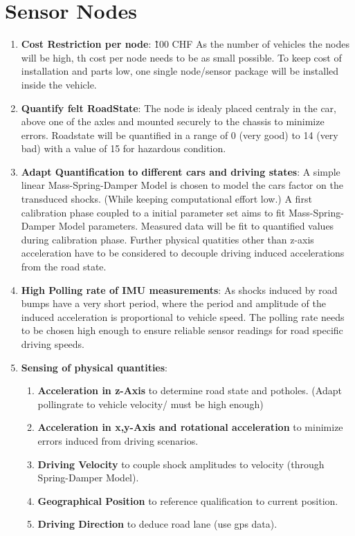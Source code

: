 \section{Sensor Nodes}

\begin{enumerate}
    \item \textbf{Cost Restriction per node}: \~100 CHF  
       As the number of vehicles the nodes will be high, th cost per node needs to be as small possible. To keep cost of installation and parts low, one single node/sensor package will be installed inside the vehicle.
    
    \item \textbf{Quantify felt RoadState}:
       The node is idealy placed centraly in the car, above one of the axles and mounted securely to the chassis to minimize errors.
       Roadstate will be quantified in a range of 0 (very good) to 14 (very bad) with a value of 15 for hazardous condition.
    
    \item \textbf{Adapt Quantification to different cars and driving states}:
       A simple linear Mass-Spring-Damper Model is chosen to model the cars factor on the transduced shocks. (While keeping computational effort low.)
       A first calibration phase coupled to a initial parameter set aims to fit Mass-Spring-Damper Model parameters.
       Measured data will be fit to quantified values during calibration phase.
       Further physical quatities other than z-axis acceleration have to be considered to decouple driving induced accelerations from the road state.
    
    \item \textbf{High Polling rate of IMU measurements}:
       As shocks induced by road bumps have a very short period, where the period and amplitude of the induced acceleration is proportional to vehicle speed. The polling rate needs to be chosen high enough to ensure reliable sensor readings for road specific driving speeds.
    
    \item \textbf{Sensing of physical quantities}:
       \begin{enumerate}
       \item \textbf{Acceleration in z-Axis} to determine road state and potholes. (Adapt pollingrate to vehicle velocity/ must be high enough)
       \item \textbf{Acceleration in x,y-Axis and rotational acceleration} to minimize errors induced from driving scenarios.
       \item \textbf{Driving Velocity} to couple shock amplitudes to velocity (through Spring-Damper Model).
       \item \textbf{Geographical Position} to reference qualification to current position.
       \item \textbf{Driving Direction} to deduce road lane (use gps data).
       \end{enumerate}
    

\end{enumerate}
